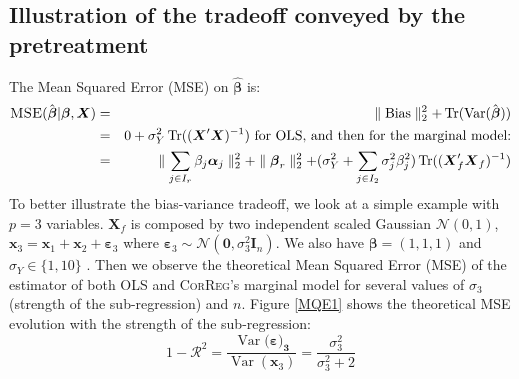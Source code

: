 \documentclass[11pt,a4paper]{article}
\begin{document}
	\subsection{Illustration of the tradeoff conveyed by the pretreatment}		  
	 The Mean Squared Error (\textsc{MSE}) on $\hat{\boldsymbol{\beta}}$ is:
	\begin{eqnarray}
		\textsc{MSE}(\hat{\boldsymbol{\beta}}|\boldsymbol{\beta},\boldsymbol{X})&=&\parallel \operatorname{Bias}\parallel_2^2+\operatorname{Tr}(\operatorname{Var}(\hat{\boldsymbol{\beta}})) \\
			&=& 0 + \sigma_Y^2 \operatorname{Tr}((\boldsymbol{X}'\boldsymbol{X})^{-1}) \textrm{ for OLS, and then for the marginal model:} \\
			&=& \parallel\sum_{j \in I_r}\beta_{j}\boldsymbol{\alpha}_j \parallel_2^2 +\parallel \boldsymbol{\beta}_r\parallel^2_2 + (\sigma^2_Y+\sum_{j \in I_2}\sigma^2_{j}\beta_{j}^2 ) \operatorname{Tr}((\boldsymbol{X}_f' \boldsymbol{X}_f)^{-1})
	\end{eqnarray}	 
	To better illustrate the bias-variance tradeoff, we look at a simple example with $p=3$ variables. $\boldsymbol{X}_f$ is composed by two independent scaled Gaussian $\mathcal{N}(0,1)$, $\boldsymbol{x}_3=\boldsymbol{x}_1+\boldsymbol{x}_2+\boldsymbol{\varepsilon}_3$ where $\boldsymbol{\varepsilon}_3\sim{\mathcal{N}(\boldsymbol{0},\sigma_3^2\boldsymbol{I}_n)}$. We also have $\boldsymbol{\beta}=(1,1,1)$ and $\sigma_Y \in \{1,10\}$  . Then we observe the theoretical Mean Squared Error (MSE) of the estimator of both OLS and \textsc{CorReg}'s marginal  model for several values of $\sigma_3$ (strength of the sub-regression) and $n$. Figure \ref{MQE1} shows the theoretical MSE evolution with the strength of the sub-regression:
	\begin{equation}
		1-\mathcal{R}^2=\frac{\operatorname{Var}(\boldsymbol{\varepsilon)_3}}{\operatorname{Var}(\boldsymbol{x}_3)}=\frac{\sigma_3^2}{\sigma_3^2+2}
	\end{equation}
	
\end{document}
